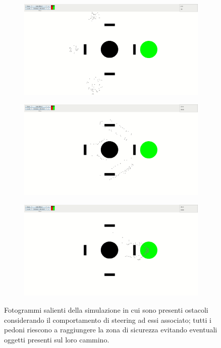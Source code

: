 \begin{figure}
    \centering
    \begin{subfigure}[b]{0.75\textwidth}
        \centering
        \includegraphics[width=\textwidth]{immagini/casi-studio/obstacle-avoidance-begin.png}
    \end{subfigure}
    \hfill
    \begin{subfigure}[b]{0.75\textwidth}
        \centering
        \includegraphics[width=\textwidth]{immagini/casi-studio/obstacle-avoidance-during.png}
    \end{subfigure}
    \hfill
    \begin{subfigure}[b]{0.75\textwidth}
        \centering
        \includegraphics[width=\textwidth]{immagini/casi-studio/obstacle-avoidance-end.png}
    \end{subfigure}
    \caption{Fotogrammi salienti della simulazione in cui sono presenti ostacoli considerando il comportamento di steering ad essi associato; tutti i pedoni riescono a raggiungere la zona di sicurezza evitando eventuali oggetti presenti sul loro cammino.}
    \label{fig:obstacle-avoidance}
\end{figure}